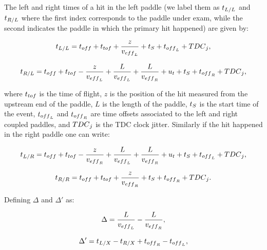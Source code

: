 \documentclass{elsart}
\begin{document}
The left and right times of a hit in the left paddle (we label them as $t_{{\rm{L}}/{\rm{L}}}$ and
$t_{\rm{R}/{\rm{L}}}$ where the first index corresponds to the paddle under exam, while the second indicates
the paddle in which the primary hit happened) are given by:

\begin{equation}
\label{eq_time_hit_lr}
t_{{\rm{L}}/{\rm{L}}}=t_{\rm{off}}+t_{\rm{tof}}+\frac{z}{v_{\rm{eff}_L}}+t_{\rm{S}}+t_{\rm{off}_{\rm{L}}}+{\rm{TDC}}_{\rm{j}},
\end{equation}

\begin{equation}
\label{eq_time_hit_lr1}
t_{{\rm{R}/{\rm{L}}}}=t_{\rm{off}}+t_{\rm{tof}}-\frac{z}{v_{\rm{eff}_L}}+\frac{L}{v_{\rm{eff}_L}}
+\frac{L}{v_{\rm{eff}_{\rm{R}}}}+u_{\rm{t}}+t_{\rm{S}}+t_{\rm{off}_{\rm{R}}}+{\rm{TDC}}_{\rm{j}},
\end{equation}

\noindent
where $t_{\rm{tof}}$ is the time of flight, $z$ is the position of the hit measured from the upstream end of the
paddle, $L$ is the length of the paddle, $t_{\rm{S}}$ is the start time of the event, $t_{\rm{off}_{\rm{L}}}$ and
$t_{\rm{off}_{\rm{R}}}$ are time offsets associated to the left and right coupled paddles, and ${\rm{TDC}}_{\rm{j}}$
is the TDC clock jitter. Similarly if the hit happened in the right paddle one can write:

\begin{equation}
  t_{{\rm{L}}/{\rm{R}}}=t_{\rm{off}}+t_{\rm{tof}}-\frac{z}{v_{\rm{eff}_{\rm{R}}}}+\frac{L}{v_{\rm{eff}_L}}
  +\frac{L}{v_{\rm{eff}_{\rm{R}}}}+u_{\rm{t}}+t_{\rm{S}}+t_{\rm{off}_{\rm{L}}}+{\rm{TDC}}_{\rm{j}},
\end{equation}

\begin{equation}
t_{R/R}=t_{\rm{off}}+t_{\rm{tof}}+\frac{z}{v_{\rm{eff}_{\rm{R}}}}+t_{\rm{S}}+t_{\rm{off}_{\rm{R}}}+{\rm{TDC}}_{\rm{j}}.
\end{equation}

Defining $\Delta$ and $\Delta'$ as:

\begin{equation}
\Delta=\frac{L}{v_{\rm{eff}_L}}-\frac{L}{v_{\rm{eff}_{\rm{R}}}},
\end{equation}

\begin{equation}
\Delta'=t_{\rm{L}/{\rm{X}}}-t_{\rm{R}/{\rm{X}}}+t_{\rm{off}_{\rm{R}}}-t_{\rm{off}_{\rm{L}}},
\end{equation}
\end{document}
